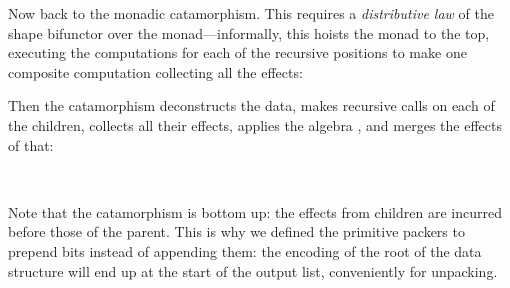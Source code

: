 \documentclass[fleqn,runningheads]{llncs}
\begin{document}
\begin{AgdaAlign}
Now back to the monadic catamorphism. This requires a \emph{distributive law} of the shape bifunctor over the monad---informally, this hoists the monad to the top, executing the computations for each of the recursive positions to make one composite computation collecting all the effects:
\begin{code}%
%
\>[2]\AgdaSpace{}%
\AgdaSymbol{:}\AgdaSpace{}%
\AgdaSymbol{(}\AgdaSpace{}%
\AgdaSymbol{:}\AgdaSpace{}%
\AgdaSymbol{)}\AgdaSpace{}%
\AgdaSpace{}%
\AgdaOperator{\AgdaFunction{[[}}\AgdaSpace{}%
\AgdaSpace{}%
\AgdaOperator{\AgdaFunction{]]B}}\AgdaSpace{}%
\AgdaSpace{}%
\AgdaSymbol{(}\AgdaSpace{}%
\AgdaSymbol{)}\AgdaSpace{}%
\AgdaSpace{}%
\AgdaSpace{}%
\AgdaSymbol{(}\AgdaOperator{\AgdaFunction{[[}}\AgdaSpace{}%
\AgdaSpace{}%
\AgdaOperator{\AgdaFunction{]]B}}\AgdaSpace{}%
\AgdaSpace{}%
\AgdaSymbol{)}\<%
\end{code}
Then the catamorphism deconstructs the data, makes recursive calls on each of the children, collects all their effects, applies the algebra , and merges the effects of that:
\begin{code}%
%
\>[2]\AgdaSymbol{\{-\#}\AgdaSpace{}%
\AgdaSpace{}%
\AgdaSymbol{\#-\}}\<%
\\
%
\>[2]\AgdaSpace{}%
\AgdaSpace{}%
\AgdaSpace{}%
\AgdaSymbol{(}\AgdaSpace{}%
\AgdaSymbol{)}\AgdaSpace{}%
\AgdaSymbol{=}%
\>[23]\AgdaSpace{}%
\AgdaSymbol{(}\AgdaSpace{}%
\AgdaOperator{\AgdaPostulate{<\$>}}\AgdaSpace{}%
\AgdaSymbol{(}\AgdaSpace{}%
\AgdaSpace{}%
\AgdaSymbol{(}\AgdaSpace{}%
\AgdaSpace{}%
\AgdaSpace{}%
\AgdaSymbol{(}\AgdaSpace{}%
\AgdaSpace{}%
\AgdaSymbol{)}\AgdaSpace{}%
\AgdaSymbol{)))}\<%
\end{code}
Note that the catamorphism is bottom up: the effects from children are incurred before those of the parent. This is why we defined the primitive packers to prepend bits instead of appending them: the encoding of the root of the data structure will end up at the start of the output list, conveniently for unpacking.


\end{AgdaAlign}
\end{document}
